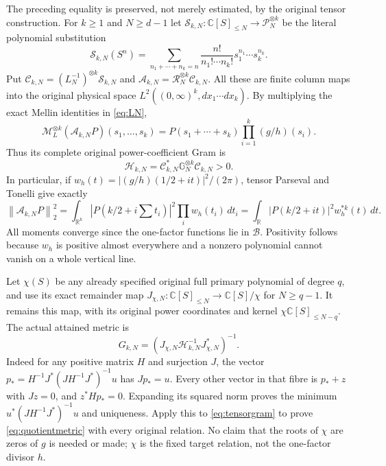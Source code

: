 \documentclass[11pt]{article}
\newcommand{\C}{\mathbb C}\newcommand{\R}{\mathbb R}
\newcommand{\B}{\mathscr B}\newcommand{\HH}{\mathcal H}
\newcommand{\ML}{\mathcal M_{\!L}}\newcommand{\MR}{\mathcal M_{\!R}}
\newcommand{\PP}{\mathcal P}\newcommand{\Fc}{\mathcal F_+}
\newcommand{\norm}[1]{\left\lVert#1\right\rVert}
\begin{document}
The preceding equality is preserved, not merely estimated, by
the original tensor construction. For $k\geq1$ and $N\geq d-1$
let $\mathcal S_{k,N}:\C[S]_{\leq N}\to\PP_N^{\otimes k}$
be the literal polynomial substitution
\begin{equation}\label{eq:multinomial}
 \mathcal S_{k,N}(S^n)=
 \sum_{n_1+\cdots+n_k=n}\frac{n!}{n_1!\cdots n_k!}
                                  s_1^{n_1}\cdots s_k^{n_k}.
\end{equation}
Put $\mathcal C_{k,N}=(L_N^{-1})^{\otimes k}\mathcal S_{k,N}$
and $\mathcal A_{k,N}=\mathcal R_N^{\otimes k}\mathcal C_{k,N}$.
All these are finite column maps into the original physical
space $L^2((0,\infty)^k,dx_1\cdots dx_k)$. By multiplying
the exact Mellin identities in \eqref{eq:LN},
\begin{equation}\label{eq:tensorsource}
 \ML^{\otimes k}(\mathcal A_{k,N}P)(s_1,\ldots,s_k)
           =P(s_1+\cdots+s_k)\prod_{i=1}^k(g/h)(s_i).
\end{equation}
Thus its complete original power-coefficient Gram is
\begin{equation}\label{eq:tensorgram}
 \mathcal H_{k,N}=\mathcal C_{k,N}^*
                    \mathbb G_N^{\otimes k}\mathcal C_{k,N}>0.
\end{equation}
In particular, if $w_h(t)=|(g/h)(1/2+it)|^2/(2\pi)$,
tensor Parseval and Tonelli give exactly
\begin{equation}\label{eq:convolutionmetric}
 \norm{\mathcal A_{k,N}P}_2^2
  =\int_{\R^k}|P(k/2+i\textstyle\sum t_i)|^2
                       \prod_iw_h(t_i)\,dt_i
  =\int_\R|P(k/2+it)|^2w_h^{*k}(t)\,dt.
\end{equation}
All moments converge since the one-factor functions lie in
$\B$. Positivity follows because $w_h$ is positive almost
everywhere and a nonzero polynomial cannot vanish on a
whole vertical line.

Let $\chi(S)$ be any already specified original full primary
polynomial of degree $q$, and use its exact remainder map
$J_{\chi,N}:\C[S]_{\leq N}\to\C[S]/\chi$ for $N\geq q-1$.
It remains this map, with its original power coordinates and
kernel $\chi\C[S]_{\leq N-q}$. The actual attained metric is
\begin{equation}\label{eq:quotientmetric}
 G_{k,N}=\left(J_{\chi,N}\mathcal H_{k,N}^{-1}
                                           J_{\chi,N}^*\right)^{-1}.
\end{equation}
Indeed for any positive matrix $H$ and surjection $J$, the
vector $p_*=H^{-1}J^*(JH^{-1}J^*)^{-1}u$ has $Jp_*=u$.
Every other vector in that fibre is $p_*+z$ with $Jz=0$,
and $z^*Hp_*=0$. Expanding its squared norm proves the
minimum $u^*(JH^{-1}J^*)^{-1}u$ and uniqueness.
Apply this to \eqref{eq:tensorgram} to prove
\eqref{eq:quotientmetric} with every original relation.
No claim that the roots of $\chi$ are zeros of $g$ is needed
or made; $\chi$ is the fixed target relation, not the
one-factor divisor $h$.
\end{document}
